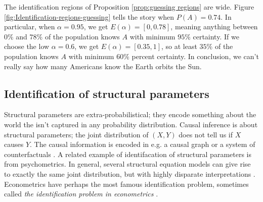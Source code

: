 The identification regions of Proposition \ref{prop:guessing regions} are wide. Figure \ref{fig:Identification-regions-guessing} tells the story when $P(A)=0.74$. In particular, when $\alpha=0.95$, we get $E(\alpha)=[0,0.78]$, meaning anything between $0\%$ and $78\%$ of the population knows $A$ with minimum $95\%$ certainty. If we choose the low $\alpha=0.6$, we get $E(\alpha)=[0.35,1]$, so at least $35\%$ of the population knows $A$ with minimum $60\%$ percent certainty. In conclusion, we can't really say how many Americans know the Earth orbits the Sun.

\subsection{Identification of structural parameters}

Structural parameters are extra-probabilistical; they encode something
about the world the isn't captured in any probability distribution.
Causal inference is about structural parameters; the joint distribution
of $(X,Y)$ does not tell us if $X$ causes $Y$. The causal information
is encoded in e.g. a causal graph \parencite{Pearl2009-zf} or a system
of counterfactuals \parencite[Chapter 4]{Pearl2016-tc}. A related example
of identifacation of structural parameters is from psychometrics.
In general, several structural equation models can give rise to exactly
the same joint distribution, but with highly disparate interpretations
\parencite{Raykov2001-ap}. Econometrics have perhaps the most famous
identification problem, sometimes called \textit{the identification problem in econometrics} \parencite{Manski1999-ab}.
